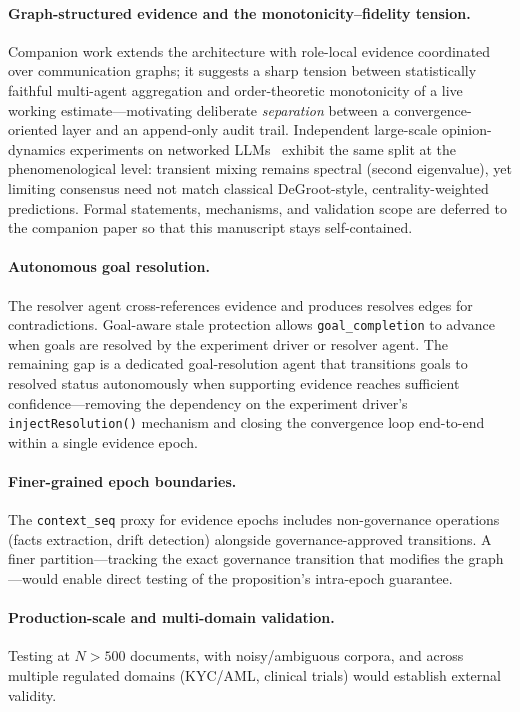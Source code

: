 \documentclass[11pt]{article}
\begin{document}
\paragraph{Graph-structured evidence and the monotonicity--fidelity tension.} Companion work extends the architecture with role-local evidence coordinated over communication graphs; it suggests a sharp tension between statistically faithful multi-agent aggregation and order-theoretic monotonicity of a live working estimate---motivating deliberate \emph{separation} between a convergence-oriented layer and an append-only audit trail. Independent large-scale opinion-dynamics experiments on networked LLMs~\cite{yazici2026opinion} exhibit the same split at the phenomenological level: transient mixing remains spectral (second eigenvalue), yet limiting consensus need not match classical DeGroot-style, centrality-weighted predictions. Formal statements, mechanisms, and validation scope are deferred to the companion paper so that this manuscript stays self-contained.

\paragraph{Autonomous goal resolution.} The resolver agent cross-references evidence and produces resolves edges for contradictions. Goal-aware stale protection allows \texttt{goal\_completion} to advance when goals are resolved by the experiment driver or resolver agent. The remaining gap is a dedicated goal-resolution agent that transitions goals to resolved status autonomously when supporting evidence reaches sufficient confidence---removing the dependency on the experiment driver's \texttt{injectResolution()} mechanism and closing the convergence loop end-to-end within a single evidence epoch.

\paragraph{Finer-grained epoch boundaries.} The \texttt{context\_seq} proxy for evidence epochs includes non-governance operations (facts extraction, drift detection) alongside governance-approved transitions. A finer partition---tracking the exact governance transition that modifies the graph---would enable direct testing of the proposition's intra-epoch guarantee.

\paragraph{Production-scale and multi-domain validation.} Testing at $N > 500$ documents, with noisy/ambiguous corpora, and across multiple regulated domains (KYC/AML, clinical trials) would establish external validity.
\end{document}
